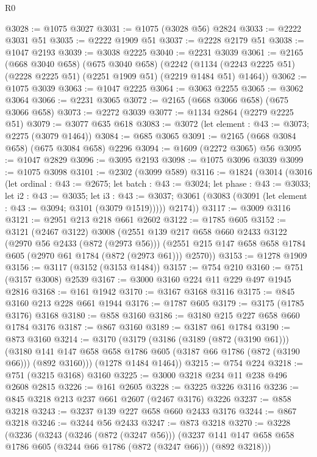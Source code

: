 \begin{lexlean}{R0}
\begin{coremodule}
@3028 := @1075 @3027
@3031 := @1075 (@3028 @56) @2824
@3033 := @2222 @3031 @51
@3035 := @2222 @1909 @51
@3037 := @2228 @2179 @51
@3038 := @1047 @2193
@3039 := @3038 @2225
@3040 := @2231 @3039
@3061 := @2165
    (@668 @3040 @658)
    (@675 @3040 @658)
    (@2242 (@1134 (@2243 @2225 @51) (@2228 @2225 @51) (@2251 @1909 @51) (@2219 @1484 @51) @1464))
@3062 := @1075 @3039
@3063 := @1047 @2225
@3064 := @3063 @2255
@3065 := @3062 @3064
@3066 := @2231 @3065
@3072 := @2165 (@668 @3066 @658) (@675 @3066 @658)
@3073 := @2272 @3039
@3077 := @1134 @2864 (@2279 @2225 @51)
@3079 := @3077 @635 @618
@3083 := @3072 (let element : @43 := @3073; @2275 (@3079 @1464))
@3084 := @685 @3065
@3091 := @2165 (@668 @3084 @658) (@675 @3084 @658) @2296
@3094 := @1609 (@2272 @3065) @56
@3095 := @1047 @2829
@3096 := @3095 @2193
@3098 := @1075 @3096 @3039
@3099 := @1075 @3098
@3101 := @2302 (@3099 @589)
@3116 := @1824
    (@3014
      (@3016
        (let ordinal : @43 := @2675;
        let batch : @43 := @3024;
        let phase : @43 := @3033;
        let i2 : @43 := @3035;
        let i3 : @43 := @3037;
        @3061 (@3083 (@3091 (let element : @43 := @3094; @3101 (@3079 @1519)))))
        @2174))
@3117 := @3009 @3116
@3121 := @2951 @213 @218 @661 @2602
@3122 := @1785 @605
@3152 := @3121
    (@2467 @3122)
    @3008
    (@2551
      @139
      @217
      @658
      @660
      @2433
      @3122
      (@2970 @56 @2433 (@872 (@2973 @56)))
      (@2551 @215 @147 @658 @658 @1784 @605 (@2970 @61 @1784 (@872 (@2973 @61))) @2570))
@3153 := @1278 @1909
@3156 := @3117 (@3152 (@3153 @1484))
@3157 := @754 @210
@3160 := @751 (@3157 @3008) @2539
@3167 := @3000 @3160 @224 @11 @229 @497 @1945 @2816
@3168 := @161 @1942
@3170 := @3167 @3168 @3116
@3175 := @845 @3160 @213 @228 @661 @1944
@3176 := @1787 @605
@3179 := @3175 (@1785 @3176) @3168
@3180 := @858 @3160
@3186 := @3180 @215 @227 @658 @660 @1784 @3176
@3187 := @867 @3160
@3189 := @3187 @61 @1784
@3190 := @873 @3160
@3214 := @3170
    (@3179
      (@3186
        (@3189 (@872 (@3190 @61)))
        (@3180 @141 @147 @658 @658 @1786 @605 (@3187 @66 @1786 (@872 (@3190 @66))) (@892 @3160)))
      (@1278 @1484 @1464))
@3215 := @754 @224
@3218 := @751 (@3215 @3168) @3160
@3225 := @3000 @3218 @234 @11 @238 @496 @2608 @2815
@3226 := @161 @2605
@3228 := @3225 @3226 @3116
@3236 := @845 @3218 @213 @237 @661 @2607 (@2467 @3176) @3226
@3237 := @858 @3218
@3243 := @3237 @139 @227 @658 @660 @2433 @3176
@3244 := @867 @3218
@3246 := @3244 @56 @2433
@3247 := @873 @3218
@3270 := @3228
    (@3236
      (@3243
        (@3246 (@872 (@3247 @56)))
        (@3237 @141 @147 @658 @658 @1786 @605 (@3244 @66 @1786 (@872 (@3247 @66))) (@892 @3218)))

\end{coremodule}
\end{lexlean}
